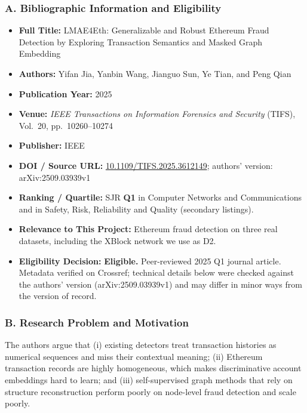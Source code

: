 \documentclass[11pt,a4paper]{article}
\begin{document}
\subsubsection*{A. Bibliographic Information and Eligibility}
\begin{itemize}[leftmargin=*]
    \item \textbf{Full Title:} LMAE4Eth: Generalizable and Robust Ethereum Fraud Detection by Exploring Transaction Semantics and Masked Graph Embedding
    \item \textbf{Authors:} Yifan Jia, Yanbin Wang, Jianguo Sun, Ye Tian, and Peng Qian
    \item \textbf{Publication Year:} 2025
    \item \textbf{Venue:} \textit{IEEE Transactions on Information Forensics and Security} (TIFS), Vol.~20, pp.~10260--10274
    \item \textbf{Publisher:} IEEE
    \item \textbf{DOI / Source URL:} \href{https://doi.org/10.1109/TIFS.2025.3612149}{10.1109/TIFS.2025.3612149}; authors' version: arXiv:2509.03939v1
    \item \textbf{Ranking / Quartile:} SJR \textbf{Q1} in Computer Networks and Communications and in Safety, Risk, Reliability and Quality (secondary listings).
    \item \textbf{Relevance to This Project:} Ethereum fraud detection on three real datasets, including the XBlock network we use as D2.
    \item \textbf{Eligibility Decision:} \textbf{Eligible.} Peer-reviewed 2025 Q1 journal article. Metadata verified on Crossref; technical details below were checked against the authors' version (arXiv:2509.03939v1) and may differ in minor ways from the version of record.
\end{itemize}

\subsubsection*{B. Research Problem and Motivation}
The authors argue that (i) existing detectors treat transaction histories as numerical sequences and miss their contextual meaning; (ii) Ethereum transaction records are highly homogeneous, which makes discriminative account embeddings hard to learn; and (iii) self-supervised graph methods that rely on structure reconstruction perform poorly on node-level fraud detection and scale poorly.
\end{document}
